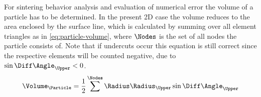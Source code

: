 For sintering behavior analysis and evaluation of numerical error the volume of a particle has to be determined.
In the present 2D case the volume reduces to the area enclosed by the surface line, which is calculated by summing over all element triangles as in \cref{eq:particle-volume}, where $\Nodes$ is the set of all nodes the particle consists of.
Note that if undercuts occur this equation is still correct since the respective elements will be counted negative, due to $\sin \Diff\Angle_{\Upper} < 0$.
\begin{equation}
    \Volume_{\Particle} = \frac12 \sum^{\Nodes} \Radius\Radius_{\Upper} \sin \Diff\Angle_{\Upper}
    \label{eq:particle-volume}
\end{equation}
